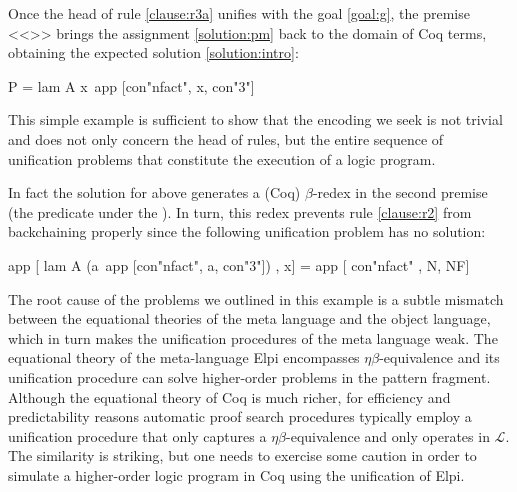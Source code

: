 \documentclass[sigconf,natbib=false,review]{acmart}
\newcommand{\llambda}{\ensuremath{\mathcal{L}}\xspace}
\begin{document}
\noindent
Once the head of rule \ref{clause:r3a} unifies with the goal \ref{goal:g},
the premise <<>> brings the assignment \ref{solution:pm}
back to the domain  of Coq terms, obtaining the expected solution
\ref{solution:intro}:

\begin{elpicode}
P = lam A x\ app [con"nfact", x, con"3"]
\end{elpicode}

\noindent
This simple example is sufficient to show that the encoding we seek
is not trivial and does not only concern the head of rules, but the entire sequence
of unification problems that constitute the execution of a logic program.

In fact
the solution for  above generates a
(Coq) $\beta$-redex in the second premise (the predicate
under the \hspace{-0.4em}).
In turn, this redex prevents rule \ref{clause:r2} from backchaining properly since
the following unification problem has no solution:

\begin{elpicode}
app [ lam A (a\ app [con"nfact", a, con"3"]) , x] =
app [ con"nfact"                             , N, NF]
\end{elpicode}

\noindent
The root cause of the problems we outlined in this example
is a subtle mismatch between the equational theories of the meta language
and the object language, which in turn makes the 
unification procedures of the meta language weak.
The equational theory of the meta-language Elpi encompasses
$\eta\beta$-equivalence and its unification procedure can solve higher-order
problems in the pattern fragment. Although 
the equational theory of Coq is much richer, for efficiency and predictability
reasons automatic proof search procedures typically employ a unification
procedure that only captures a $\eta\beta$-equivalence and only operates
in \llambda. The similarity is striking, but one needs to exercise some caution in order to
simulate a higher-order logic program in Coq using the unification of Elpi.
\end{document}
